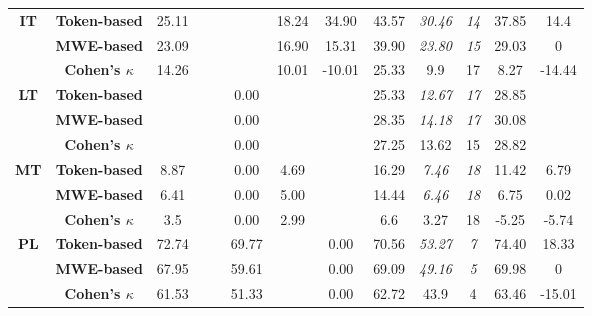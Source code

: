 \documentclass[output=paper
,modfonts
,nonflat,draftmode]{langsci/langscibook}
\begin{document}
\begin{table}
{\begin{tabular}{ccccccccccccc}
\textbf{\scriptsize{}IT} & \textbf{\scriptsize{}Token-based} & {\scriptsize{}25.11} &  &  &  & {\scriptsize{}18.24} & {\scriptsize{}34.90} & {\scriptsize{}43.57} & \emph{\scriptsize{}30.46} & \textit{\scriptsize{}14} & {\scriptsize{}37.85} & {\scriptsize{}14.4}\tabularnewline
 & \textbf{\scriptsize{}MWE-based} & {\scriptsize{}23.09} &  &  &  & {\scriptsize{}16.90} & {\scriptsize{}15.31} & {\scriptsize{}39.90} & \emph{\scriptsize{}23.80} & \textit{\scriptsize{}15} & {\scriptsize{}29.03} & {\scriptsize{}0}\tabularnewline
   & \textbf{\scriptsize{}Cohen's $\kappa$} &\scriptsize{14.26}  &\scriptsize{}  &\scriptsize{}  & \scriptsize{} &\scriptsize{10.01}  &\scriptsize{-10.01}  &\scriptsize{25.33} &\scriptsize{9.9}  &\scriptsize{17} & \scriptsize{8.27} &\scriptsize{-14.44}  \tabularnewline
\midrule 

\textbf{\scriptsize{}LT} & \textbf{\scriptsize{}Token-based} &  &  &  & {\scriptsize{}0.00} &  &  & {\scriptsize{}25.33} & \emph{\scriptsize{}12.67} & \textit{\scriptsize{}17} & {\scriptsize{}28.85} & \tabularnewline
 & \textbf{\scriptsize{}MWE-based} &  &  &  & {\scriptsize{}0.00} &  &  & {\scriptsize{}28.35} & \emph{\scriptsize{}14.18} & \textit{\scriptsize{}17} & {\scriptsize{}30.08} & \tabularnewline
   & \textbf{\scriptsize{}Cohen's $\kappa$} &\scriptsize{}  &\scriptsize{}  &\scriptsize{}  & \scriptsize{0.00} &\scriptsize{}  &\scriptsize{}  &\scriptsize{27.25} &\scriptsize{13.62}  &\scriptsize{15} & \scriptsize{28.82} &\scriptsize{}  \tabularnewline
\midrule 

\textbf{\scriptsize{}MT} & \textbf{\scriptsize{}Token-based} & {\scriptsize{}8.87} &  &  & {\scriptsize{}0.00} & {\scriptsize{}4.69} &  & {\scriptsize{}16.29} & \emph{\scriptsize{}7.46} & \textit{\scriptsize{}18} & {\scriptsize{}11.42} & {\scriptsize{}6.79}\tabularnewline
 & \textbf{\scriptsize{}MWE-based} & {\scriptsize{}6.41} &  &  & {\scriptsize{}0.00} & {\scriptsize{}5.00} &  & {\scriptsize{}14.44} & \emph{\scriptsize{}6.46} & \textit{\scriptsize{}18} & {\scriptsize{}6.75} & {\scriptsize{}0.02}\tabularnewline
   & \textbf{\scriptsize{}Cohen's $\kappa$} &\scriptsize{3.5}  &\scriptsize{}  &\scriptsize{}  & \scriptsize{0.00} &\scriptsize{2.99}  &\scriptsize{}  &\scriptsize{6.6} &\scriptsize{3.27}  &\scriptsize{18} & \scriptsize{-5.25} &\scriptsize{-5.74}  \tabularnewline
\midrule 

\textbf{\scriptsize{}PL} & \textbf{\scriptsize{}Token-based} & {\scriptsize{}72.74} &  &  & {\scriptsize{}69.77} &  & {\scriptsize{}0.00} & {\scriptsize{}70.56} & \emph{\scriptsize{}53.27} & \textit{\scriptsize{}7} & {\scriptsize{}74.40} & {\scriptsize{}18.33}\tabularnewline
 & \textbf{\scriptsize{}MWE-based} & {\scriptsize{}67.95} &  &  & {\scriptsize{}59.61} &  & {\scriptsize{}0.00} & {\scriptsize{}69.09} & \emph{\scriptsize{}49.16} & \textit{\scriptsize{}5} & {\scriptsize{}69.98} & {\scriptsize{}0}\tabularnewline
   & \textbf{\scriptsize{}Cohen's $\kappa$} &\scriptsize{61.53}  &\scriptsize{}  &\scriptsize{}  & \scriptsize{51.33} &\scriptsize{}  &\scriptsize{0.00}  &\scriptsize{62.72} &\scriptsize{43.9}  &\scriptsize{4} & \scriptsize{63.46} &\scriptsize{-15.01} \tabularnewline
\midrule 


\end{tabular}}
\end{table}
\end{document}

